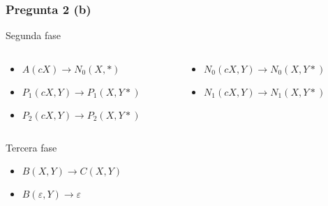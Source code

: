 \documentclass{beamer}
\begin{document}
\begin{frame}
    \frametitle{Pregunta 2 (b)}
    
    \begin{block}{Segunda fase}
        \begin{columns}
            \begin{column}{0.48\textwidth}
                \begin{itemize}
                    \item $A(cX)\to N_0(X,*)$
                          \pause 
                    \item $P_1(cX,Y)\to P_1(X,Y*)$
                          \pause
                    \item $P_2(cX,Y)\to P_2(X,Y*)$
                \end{itemize}
            \end{column}
            \pause
            \begin{column}{0.48\textwidth}
                \begin{itemize}   
                    \item $N_0(cX,Y)\to N_0(X,Y*)$
                          \pause
                    \item $N_1(cX,Y)\to N_1(X,Y*)$
                \end{itemize}
            \end{column}
        \end{columns}
    \end{block}
    
    \pause
    
    \begin{block}{Tercera fase}
        \begin{itemize}
            \item $B(X,Y)\to C(X,Y)$
            \item $B(\varepsilon,Y)\to \varepsilon$
        \end{itemize}
    \end{block}
\end{frame}
\end{document}

